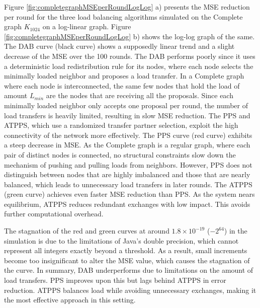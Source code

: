 Figure \ref{fig:completegraphMSEperRoundLogLog} a) presents the MSE reduction per round for the three load balancing algorithms simulated on the Complete graph $K_{1024}$ on a log-linear graph. Figure \ref{fig:completegraphMSEperRoundLogLog} b) shows the log-log graph of the same. The DAB curve (black curve) shows a supposedly linear trend and a slight decrease of the MSE over the 100 rounds. The DAB performs poorly since it uses a deterministic load redistribution rule for its nodes, where each node selects the minimally loaded neighbor and proposes a load transfer. In a Complete graph where each node is interconnected, the same few nodes that hold the load of amount $L_{min}$ are the nodes that are receiving all the proposals. Since each minimally loaded neighbor only accepts one proposal per round, the number of load transfers is heavily limited, resulting in slow MSE reduction. The PPS and ATPPS, which use a randomized transfer partner selection, exploit the high connectivity of the network more effectively. The PPS curve (red curve) exhibits a steep decrease in MSE. As the Complete graph is a regular graph, where each pair of distinct nodes is connected, no structural constraints slow down the mechanism of pushing and pulling loads from neighbors. However, PPS does not distinguish between nodes that are highly imbalanced and those that are nearly balanced, which leads to unnecessary load transfers in later rounds. The ATPPS (green curve) achieves even faster MSE reduction than PPS. As the system nears equilibrium, ATPPS reduces redundant exchanges with low impact. This avoids further computational overhead.

The stagnation of the red and green curves at around $1.8\times 10^{-19}$ ($-2^{64}$) in the simulation is due to the limitations of Java's double precision, which cannot represent all integers exactly beyond a threshold. As a result, small increments become too insignificant to alter the MSE value, which causes the stagnation of the curve. In summary, DAB underperforms due to limitations on the amount of load transfers. PPS improves upon this but lags behind ATPPS in error reduction. ATPPS balances load while avoiding unnecessary exchanges, making it the most effective approach in this setting.


